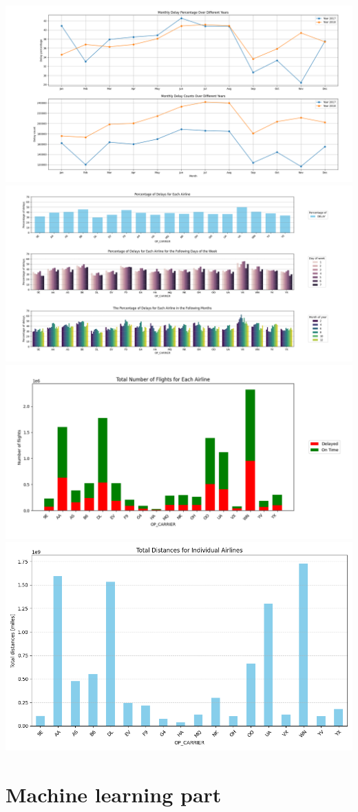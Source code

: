 \documentclass{article}
\begin{document}
	\includegraphics[scale=0.22]{plot1}
	\includegraphics[scale=0.25]{plot2}
	\includegraphics[scale=0.4]{plot3}
	\includegraphics[scale=0.4]{plot4}	

\newpage



\section{Machine learning part}
\end{document}
